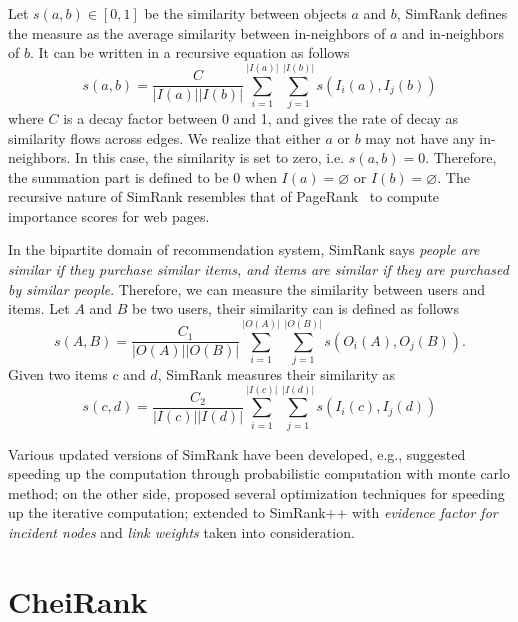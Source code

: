 Let $s(a,b)\in [0,1]$ be the similarity between objects $a$ and $b$, SimRank defines the measure as the average similarity between in-neighbors of $a$ and in-neighbors of $b$. It can be written in a recursive equation as follows
\begin{equation}
    s(a,b) = \frac{C}{|I(a)||I(b)|} \sum\limits_{i=1}^{|I(a)|} \sum\limits_{j=1}^{|I(b)|} s(I_i(a), I_j(b))
\end{equation}
where $C$ is a decay factor between 0 and 1, and gives the rate of decay as similarity flows across edges. We realize that either $a$ or $b$ may not have any in-neighbors. In this case, the similarity is set to zero, i.e. $s(a,b)=0$. Therefore, the summation part is defined to be 0 when $I(a) = \varnothing$ or $I(b) = \varnothing$. The recursive nature of SimRank resembles that of PageRank~\cite{brin1998anatomy} to compute importance scores for web pages.

In the bipartite domain of recommendation system, SimRank says \textit{people are similar if they purchase similar items, and items are similar if they are purchased by similar people}. Therefore, we can measure the similarity between users and items. Let $A$ and $B$ be two users, their similarity can is defined as follows
\begin{equation}
    s(A,B) = \frac{C_1}{|O(A)||O(B)|} \sum\limits_{i=1}^{|O(A)|} \sum\limits_{j=1}^{|O(B)|} s(O_i(A), O_j(B)).
\end{equation}
Given two items $c$ and $d$, SimRank measures their similarity as
\begin{equation}
    s(c,d) = \frac{C_2}{|I(c)||I(d)|} \sum\limits_{i=1}^{|I(c)|} \sum\limits_{j=1}^{|I(d)|} s(I_i(c), I_j(d))
\end{equation}

Various updated versions of SimRank have been developed, e.g., \cite{fogaras2005scaling} suggested speeding up the computation through probabilistic computation with monte carlo method; on the other side, \cite{lizorkin2008accuracy} proposed several optimization techniques for speeding up the iterative computation; \cite{antonellis2008simrank++} extended to SimRank++ with \textit{evidence factor for incident nodes} and \textit{link weights} taken into consideration.

\section{CheiRank}

